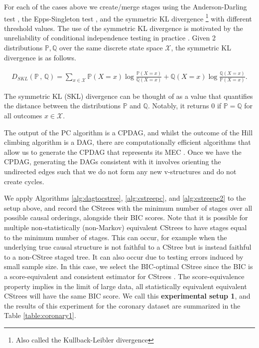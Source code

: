 \documentclass{tufte-book}
\begin{document}
For each of the cases above we create/merge stages using the Anderson-Darling test \cite{scholz-1987-k-sampl}, the Epps-Singleton test \cite{epps-1986-omnib-test}, and the symmetric KL divergence  \footnote{Also called the Kullback-Leibler divergence}  with different threshold values. The use of the symmetric KL divergence is motivated by the unreliability of conditional independence testing in practice \cite{shah-2020-hardn-condit}. Given 2 distributions \(\mathbb{P}, \mathbb{Q}\) over the same discrete state space \(\mathcal{X}\), the symmetric KL divergence is as follows. 



\begin{align*}
D_{SKL}(\mathbb{P} \, , \, \mathbb{Q}) = \sum_{x \in \mathcal{X}} \mathbb{P}(X=x)\log \frac{\mathbb{P}(X = x)}{\mathbb{Q}(X=x)} + \mathbb{Q}(X=x)\log \frac{\mathbb{Q}(X = x)}{\mathbb{P}(X=x)}.
\end{align*}

The symmetric KL (SKL) divergence can be thought of as a value that quantifies the distance between the distributions \(\mathbb{P}\) and \(\mathbb{Q}\). Notably, it returns \(0\) if \(\mathbb{P}=\mathbb{Q}\) for all outcomes \(x \in \mathcal{X}\).


The output of the PC algorithm is a CPDAG, and whilst the outcome of the Hill climbing algorithm is a DAG, there are computationally efficient algorithms that allow us to generate the CPDAG that represents its MEC \cite{chickering-2002-learn-equiv}. Once we have the CPDAG, generating the DAGs consistent with it involves orienting the undirected edges such that we do not form any new v-structures and do not create cycles. 


We apply Algorithms \ref{alg:dagtocstree}, \ref{alg:cstreepc}, and \ref{alg:cstreepc2} to the setup above, and record the CStrees with the minimum number of stages over all possible causal orderings, alongside their BIC scores. Note that it is possible for multiple non-statistically (non-Markov) equivalent CStrees to have stages equal to the minimum number of stages. This can occur, for example when the underlying true causal structure is not faithful to a CStree but is instead faithful to a non-CStree staged tree. It can also occur due to testing errors induced by small sample size. In this case, we select the BIC-optimal CStree since the BIC is a score-equivalent and consistent estimator for CStrees \cite{duarte-2021-repres-contex}. The score-equivalence property implies in the limit of large data, all statistically equivalent equivalent CStrees will have the same BIC score. We call this \textbf{experimental setup 1}, and the results of this experiment for the coronary dataset are summarized in the Table \ref{table:coronary1}.
\end{document}
